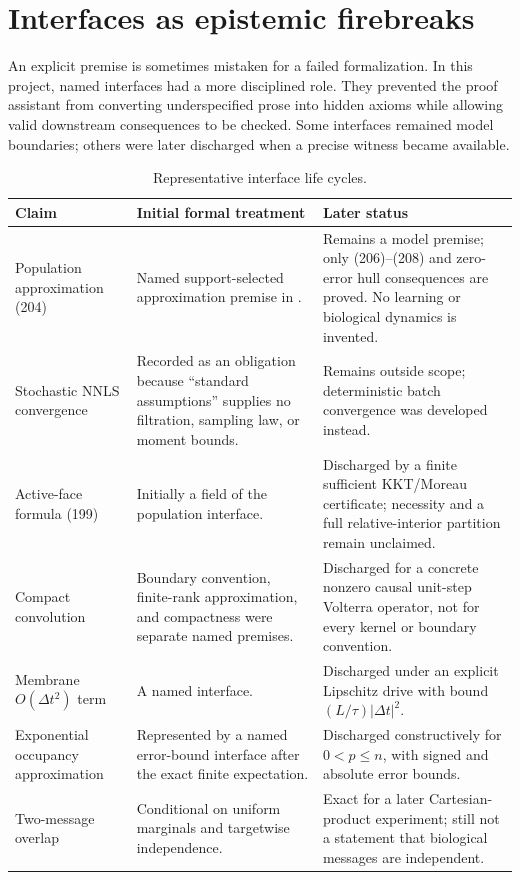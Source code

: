 \documentclass[11pt,a4paper]{article}
\newcommand{\artifact}[1]{\texttt{\detokenize{#1}}}
\begin{document}
\section{Interfaces as epistemic firebreaks}
\label{sec:interfaces}

An explicit premise is sometimes mistaken for a failed formalization. In this
project, named interfaces had a more disciplined role. They prevented the proof
assistant from converting underspecified prose into hidden axioms while allowing
valid downstream consequences to be checked. Some interfaces remained model
boundaries; others were later discharged when a precise witness became available.

\begin{table}[htbp]
\centering
\caption{Representative interface life cycles.}
\label{tab:interface-life}
\begin{tabularx}{\linewidth}{@{}L{31mm}L{53mm}Y@{}}
\toprule
\textbf{Claim} & \textbf{Initial formal treatment} & \textbf{Later status} \\
\midrule
Population approximation (204) &
Named support-selected approximation premise in \artifact{PopulationRegion}. &
Remains a model premise; only (206)--(208) and zero-error hull consequences are
proved. No learning or biological dynamics is invented. \\
Stochastic NNLS convergence &
Recorded as an obligation because ``standard assumptions'' supplies no filtration,
sampling law, or moment bounds. &
Remains outside scope; deterministic batch convergence was developed instead. \\
Active-face formula (199) &
Initially a field of the population interface. &
Discharged by a finite sufficient KKT/Moreau certificate; necessity and a full
relative-interior partition remain unclaimed. \\
Compact convolution &
Boundary convention, finite-rank approximation, and compactness were separate named
premises. &
Discharged for a concrete nonzero causal unit-step Volterra operator, not for every
kernel or boundary convention. \\
Membrane \(O(\Delta t^2)\) term &
A named \artifact{QuadraticRemainder} interface. &
Discharged under an explicit Lipschitz drive with bound
\((L/\tau)|\Delta t|^2\). \\
Exponential occupancy approximation &
Represented by a named error-bound interface after the exact finite expectation. &
Discharged constructively for \(0<p\leq n\), with signed and absolute error bounds. \\
Two-message overlap &
Conditional on uniform marginals and targetwise independence. &
Exact for a later Cartesian-product experiment; still not a statement that
biological messages are independent. \\
\bottomrule
\end{tabularx}
\end{table}
\end{document}
